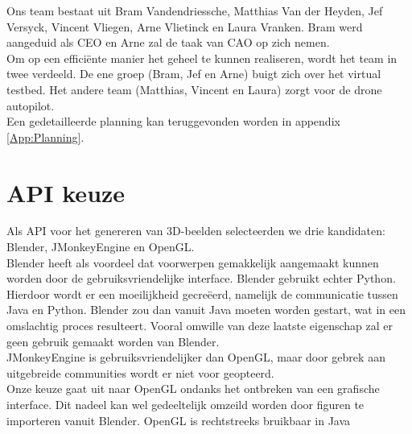 \documentclass{peno-opdracht1}
\begin{document}
\maketitle

\noindent
	Ons team bestaat uit Bram Vandendriessche, Matthias Van der Heyden, Jef Versyck, Vincent Vliegen, Arne Vlietinck en Laura Vranken. Bram werd aangeduid als CEO en Arne zal de taak van CAO op zich nemen. \\
	Om op een effici\"ente manier het geheel te kunnen realiseren, wordt het team in twee verdeeld. De ene groep (Bram, Jef en Arne) buigt zich over het virtual testbed. Het andere team  (Matthias, Vincent en Laura) zorgt voor de drone autopilot.\\
	Een gedetailleerde planning kan teruggevonden worden in appendix \ref{App:Planning}.

\section{API keuze}
Als API voor het genereren van 3D-beelden selecteerden we drie kandidaten: Blender, JMonkeyEngine en OpenGL.\\
Blender heeft als voordeel dat voorwerpen gemakkelijk aangemaakt kunnen worden door de gebruiksvriendelijke interface. Blender gebruikt echter Python. Hierdoor wordt er een moeilijkheid gecre\"eerd, namelijk de \mbox{communicatie} tussen Java en Python. Blender zou dan vanuit Java moeten worden gestart, wat in een omslachtig proces resulteert. Vooral omwille van deze laatste eigenschap zal er geen gebruik gemaakt worden van Blender. \\
JMonkeyEngine is gebruiksvriendelijker dan OpenGL, maar door gebrek aan uitgebreide communities wordt er niet voor geopteerd.\\
Onze keuze gaat uit naar OpenGL ondanks het ontbreken van een grafische interface. Dit nadeel kan wel gedeeltelijk omzeild worden door figuren te importeren vanuit Blender. OpenGL is rechtstreeks bruikbaar in Java 
\end{document}
